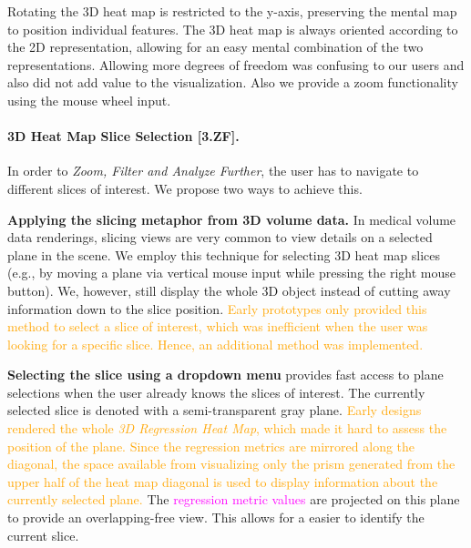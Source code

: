 \documentclass[journal]{style/vgtc} 			          %
\newcommand{\design}[1]{\textcolor{orange}{#1}}
\newcommand{\magenta}[1]{\textcolor{magenta}{#1}}
\begin{document}
Rotating the 3D heat map is restricted to the y-axis, preserving the mental map to position individual features.
The 3D heat map is always oriented according to the 2D representation, allowing for an easy mental combination of the two representations.
Allowing more degrees of freedom was confusing to our users and also did not add value to the visualization.
Also we provide a zoom functionality using the mouse wheel input.
\paragraph{3D Heat Map Slice Selection [3.ZF].}
In order to \emph{Zoom, Filter and Analyze Further}, the user has to navigate to different slices of interest.
We propose two ways to achieve this.

	\textbf{Applying the slicing metaphor from 3D volume data.}
	In medical volume data renderings, slicing views are very common to view details on a selected plane in the scene.
	We employ this technique for selecting 3D heat map slices (e.g., by moving a plane via vertical mouse input while pressing the right mouse button).
	We, however, still display the whole 3D object instead of cutting away information down to the slice position.
	\design{Early prototypes only provided this method to select a slice of interest, which was inefficient when the user was looking for a specific slice.
	Hence, an additional method was implemented.
	}

	\textbf{Selecting the slice using a dropdown menu} provides fast access to plane selections when the user already knows the slices of interest.
The currently selected slice is denoted with a semi-transparent gray plane.
\design{
Early designs rendered the whole \emph{3D Regression Heat Map}, which made it hard to assess the position of the plane.
Since the regression metrics are mirrored along the diagonal, the space available from visualizing only the prism generated from the upper half of the heat map diagonal is used to display information about the currently selected plane.
}
The \magenta{regression metric values} are projected on this plane to provide an overlapping-free view.
This allows for a easier to identify the current slice.
\end{document}
